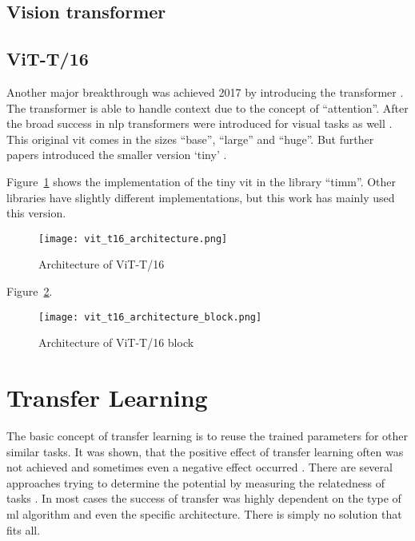 \subsection{Vision transformer}

\subsection{ViT-T/16}
Another major breakthrough was achieved 2017 by introducing the transformer \autocite{vaswani2017}. The transformer is able to handle context due to the concept of ``attention''. After the broad success in \gls{nlp} transformers were introduced for visual tasks as well \autocite{dosovitskiy2020}. This original \gls{vit} comes in the sizes ``base'', ``large'' and ``huge''. But further papers introduced the smaller version `tiny' \autocite{liu2021,wu2022}.

Figure~\ref{fig:vit_t16_architecture} shows the implementation of the tiny \gls{vit} in the library ``timm''. Other libraries have slightly different implementations, but this work has mainly used this version.

\begin{figure}[H]
    \begin{center}
    \texttt{[image: vit\_t16\_architecture.png]}
    \caption{Architecture of ViT-T/16}\label{fig:vit_t16_architecture}
    \end{center}
\end{figure}

Figure~\ref{fig:vit_t16_architecture_block}.

\begin{figure}[H]
    \begin{center}
    \texttt{[image: vit\_t16\_architecture\_block.png]}
    \caption{Architecture of ViT-T/16 block}\label{fig:vit_t16_architecture_block}
    \end{center}
\end{figure}


\section{Transfer Learning}
The basic concept of transfer learning is to reuse the trained parameters for other similar tasks. It was shown, that the positive effect of transfer learning often was not achieved and sometimes even a negative effect occurred \autocite{perkins1999}. There are several approaches trying to determine the potential by measuring the relatedness of tasks \autocite{torrey2009}. In most cases the success of transfer was highly dependent on the type of \gls{ml} algorithm and even the specific architecture. There is simply no solution that fits all.

